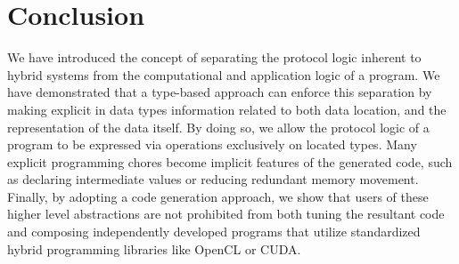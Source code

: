 
\section{Conclusion}
\label{sec:conclusion}

We have introduced the concept of separating the protocol logic  inherent to hybrid systems from the computational and application logic of a program. We have demonstrated that a type-based approach can enforce this separation by making explicit in data types information related to both data location, and the representation of the data itself. By doing so, we allow the protocol logic of a program to be expressed via operations exclusively on located types. Many explicit programming chores become implicit features of the generated code, such as declaring intermediate values or reducing redundant memory movement. Finally, by adopting a code generation approach, we show that users of these higher level abstractions are not prohibited from both tuning the resultant code and composing independently developed programs that utilize standardized hybrid programming libraries like OpenCL or CUDA.
